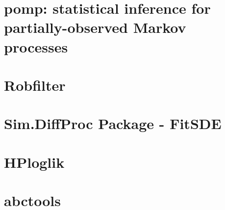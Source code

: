 \documentclass[a4paper,11pt]{article}
\begin{document}
\section{pomp: statistical inference for partially-observed Markov processes}
\section{Robfilter}
\section{Sim.DiffProc Package - FitSDE}
\section{HPloglik}
\section{abctools}
\end{document}
